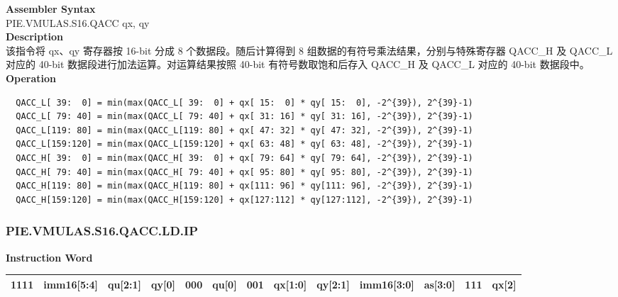 \textbf{Assembler Syntax} \\
PIE.VMULAS.S16.QACC qx, qy \\
\textbf{Description} \\
该指令将 qx、qy 寄存器按 16-bit 分成 8 个数据段。随后计算得到 8 组数据的有符号乘法结果，分别与特殊寄存器 QACC\_H 及 QACC\_L 对应的 40-bit 数据段进行加法运算。对运算结果按照 40-bit 有符号数取饱和后存入 QACC\_H 及 QACC\_L 对应的 40-bit 数据段中。\\
\textbf{Operation}
\begin{lstlisting}
  QACC_L[ 39:  0] = min(max(QACC_L[ 39:  0] + qx[ 15:  0] * qy[ 15:  0], -2^{39}), 2^{39}-1)
  QACC_L[ 79: 40] = min(max(QACC_L[ 79: 40] + qx[ 31: 16] * qy[ 31: 16], -2^{39}), 2^{39}-1)
  QACC_L[119: 80] = min(max(QACC_L[119: 80] + qx[ 47: 32] * qy[ 47: 32], -2^{39}), 2^{39}-1)
  QACC_L[159:120] = min(max(QACC_L[159:120] + qx[ 63: 48] * qy[ 63: 48], -2^{39}), 2^{39}-1)
  QACC_H[ 39:  0] = min(max(QACC_H[ 39:  0] + qx[ 79: 64] * qy[ 79: 64], -2^{39}), 2^{39}-1)
  QACC_H[ 79: 40] = min(max(QACC_H[ 79: 40] + qx[ 95: 80] * qy[ 95: 80], -2^{39}), 2^{39}-1)
  QACC_H[119: 80] = min(max(QACC_H[119: 80] + qx[111: 96] * qy[111: 96], -2^{39}), 2^{39}-1)
  QACC_H[159:120] = min(max(QACC_H[159:120] + qx[127:112] * qy[127:112], -2^{39}), 2^{39}-1)
\end{lstlisting}

\newpage
\subsubsection{PIE.VMULAS.S16.QACC.LD.IP}\label{instruction:PIEVMULASS16QACCLDIP}
\setlength\tabcolsep{6pt}
\textbf{Instruction Word} \\
\begin{tabular}{|c|c|c|c|c|c|c|c|c|c|c|c|c|}
	\hline
	1111 & imm16[5:4] & qu[2:1] & qy[0] & 000 & qu[0] & 001 & qx[1:0] & qy[2:1] & imm16[3:0] & as[3:0] & 111 & qx[2] \\
	\hline
\end{tabular}

